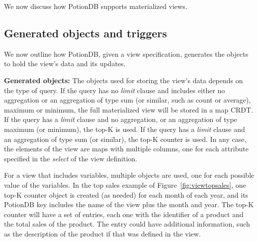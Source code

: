 \documentclass[sigplan,twocolumn,review,anonymous]{acmart}
\begin{document}
We now discuss how PotionDB supports materialized views.

\subsection{Generated objects and triggers}
\label{subsec:generated_view}

We now outline how PotionDB, given a view specification, generates the 
objects to hold the view's data and its updates. %

\noindent
\textbf{Generated objects:}
The objects used for storing the view's data depends on the type of query. 
If the query has no  \emph{limit} clause and includes either no aggregation or an aggregation of type sum (or similar, such as count or average), maximum or minimum, the full materialized view will be stored in a map CRDT. 
If the query has a  \emph{limit} clause and no aggregation, or an aggregation of type maximum (or minimum), the top-K is used.
If the query has a \emph{limit} clause and an aggregation of type sum (or similar), the top-K counter is used.
In any case, the elements of the view are maps with multiple columns, one for each
attribute specified in the  \emph{select} of the view definition.  

For a view that includes variables, multiple objects are used,
one for each possible value of the variables. 
In the top sales example of Figure~\ref{fig:viewtopsales}, one top-K counter
object is created (as needed) for each month of each year, and its PotionDB key includes
the name of the view plus the month and year.  The top-K counter will have a set
of entries, each one with the identifier of a product and the total sales of the product. The entry
could have additional information, such as the 
description of the product if that was defined in the view.
\end{document}
